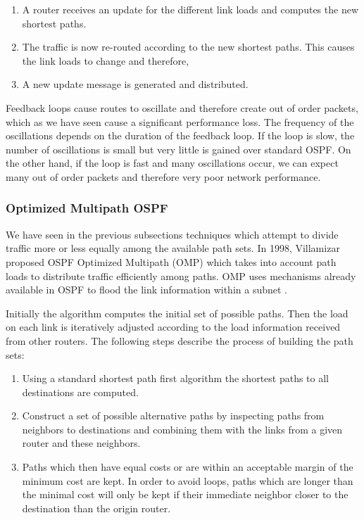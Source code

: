\begin{enumerate}
 \item A router receives an update for the different link loads and computes the new shortest paths.
 \item The traffic is now re-routed according to the new shortest paths. This causes the link loads to change and therefore,
 \item A new update message is generated and distributed.
\end{enumerate}

Feedback loops cause routes to oscillate and therefore create out of order packets, which as we have seen cause a significant performance loss. The frequency of the oscillations depends on the duration of the feedback loop. If the loop is slow, the number of oscillations is small but very little is gained over standard OSPF. On the other hand, if the loop is fast and many oscillations occur, we can expect many out of order packets and therefore very poor network performance.

\subsubsection{Optimized Multipath OSPF}

We have seen in the previous subsections techniques which attempt to divide traffic more or less equally among the available path sets. In 1998, Villamizar proposed OSPF Optimized Multipath (OMP) \cite{OMP} which takes into account path loads to distribute traffic efficiently among paths. OMP uses mechanisms already available in OSPF to flood the link information within a subnet \cite{RFC2370}.

Initially the algorithm computes the initial set of possible paths. Then the load on each link is iteratively adjusted according to the load information received from other routers. The following steps describe the process of building the path sets:

\begin{enumerate}
 \item Using a standard shortest path first algorithm the shortest paths to all destinations are computed.
 \item Construct a set of possible alternative paths by inspecting paths from neighbors to destinations and combining them with the links from a given router and these neighbors.
 \item Paths which then have equal costs or are within an acceptable margin of the minimum cost are kept. In order to avoid loops, paths which are longer than the minimal cost will only be kept if their immediate neighbor closer to the destination than the origin router.
\end{enumerate}

